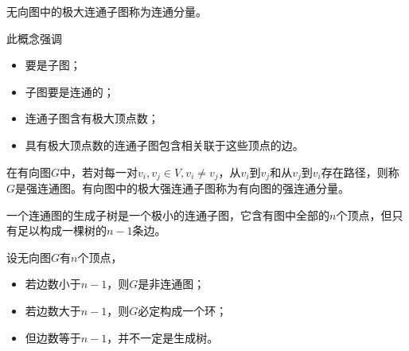 \begin{frame}\ft{\subsubsecname}
\begin{dingyi}[连通分量]
无向图中的极大连通子图称为连通分量。
\end{dingyi} %
\vspace{0.1in}

此概念强调\\[0.03in]
\begin{itemize}
\item 
要是子图； \\[0.1in]
\item
子图要是连通的；\\[0.1in]
\item
连通子图含有极大顶点数；\\[0.1in]
\item
具有极大顶点数的连通子图包含相关联于这些顶点的边。
\end{itemize}
\end{frame}


\begin{frame}\ft{\subsubsecname}
\begin{figure}
\centering

\end{figure}
\end{frame}


\begin{frame}\ft{\subsubsecname}
\begin{dingyi}
在有向图$G$中，若对每一对$v_i,v_j\in V, v_i\ne v_j$，从$v_i$到$v_j$和从$v_j$到$v_i$存在路径，则称$G$是强连通图。有向图中的极大强连通子图称为有向图的强连通分量。
\end{dingyi}
\end{frame}

\begin{frame}\ft{\subsubsecname}
\begin{figure}
\centering

\end{figure}
\end{frame}


\begin{frame}\ft{\subsubsecname}
\begin{dingyi}[连通图的生成树]
一个连通图的生成子树是一个极小的连通子图，它含有图中全部的$n$个顶点，但只有足以构成一棵树的$n-1$条边。
\end{dingyi}%
\vspace{0.1in}

设无向图$G$有$n$个顶点，\\[0.05in]
\begin{itemize}
\item
若边数小于$n-1$，则$G$是非连通图；\\[0.1in]
\item
若边数大于$n-1$，则$G$必定构成一个环；\\[0.1in]
\item
但边数等于$n-1$，并不一定是生成树。
\end{itemize}
\end{frame}

